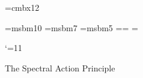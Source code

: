 
\hsize=125mm
\vsize=180mm
\hoffset=0mm
\voffset=0mm

\baselineskip=13pt

\font\twelvebf=cmbx12

\font\tenbb=msbm10
\font\sevenbb=msbm7
\font\fivebb=msbm5
\newfam\bbfam
\textfont\bbfam=\tenbb \scriptfont\bbfam=\sevenbb
\scriptscriptfont\bbfam=\fivebb
\def\bb{\fam\bbfam}

\def\Cb{{\bb C}}
\def\Hb{{\bb H}}
\def\Rb{{\bb R}}
\def\Ab{{\bb A}}
\def\Bb{{\bb B}}
\def\Eb{{\bb E}}
\def\Zb{{\bb Z}}


\def\Ac{{\cal A}}
\def\Hc{{\cal H}}
\def\Lc{{\cal L}}
\def\Uc{{\cal U}}


\def\Diff{\mathop{\rm Diff}\nolimits}
\def\Aut{\mathop{\rm Aut}\nolimits}
\def\Trace{\mathop{\rm Trace}\nolimits}
\def\Spectrum{\mathop{\rm Spectrum}\nolimits}
\def\Tr{\mathop{\rm Tr}\nolimits}
\def\Re{\mathop{\rm Re}\nolimits}
\def\Res{\mathop{\rm Res}\nolimits}
\def\Gev{\mathop{\rm Gev}\nolimits}
\def\range{\mathop{\rm range}\nolimits}
\def\Int{\mathop{\rm Int}\nolimits}
\def\Out{\mathop{\rm Out}\nolimits}
\def\Sup{\mathop{\rm Sup}\nolimits}


\def\Lb{\Lambda}
\def\lb{\lambda}
\def\g{\gamma}
\def\vp{\varphi}
\def\a{\alpha}
\def\b{\beta}
\def\g{\gamma}
\def\G{\Gamma}
\def\s{\sigma}
\def\Si{\Sigma}
\def\om{\omega}
\def\Om{\Omega}
\def\d{\delta}
\def\t{\theta}
\def\k{\kappa}
\def\ve{\varepsilon}

\def\ts{\times}
\def\ify{\infty}
\def\fl{\forall}
\def\op{\oplus}
\def\ra{\rightarrow}
\def\wt{\widetilde}
\def\ot{\otimes}
\def\part{\partial}
\def\lgl{\langle}
\def\rgl{\rangle}
\def\nb{\nabla}
\def\eqv{\equiv}
\def\apx{\approx}
\def\sm{\simeq}
\def\sbs{\subset}

\def\un{{\rm 1\mkern-4mu I}}

\def\up#1{\raise 1ex\hbox{\sevenrm#1}}

\def\semi{\mathop{>\!\!\!\triangleleft}}

\catcode`\@=11
\def\displaylinesno #1{\displ@y\halign{
\hbox to\displaywidth{$\@lign\hfil\displaystyle##\hfil$}&
\llap{$##$}\crcr#1\crcr}}





\vglue 1cm

\centerline{\twelvebf The Spectral Action Principle}

